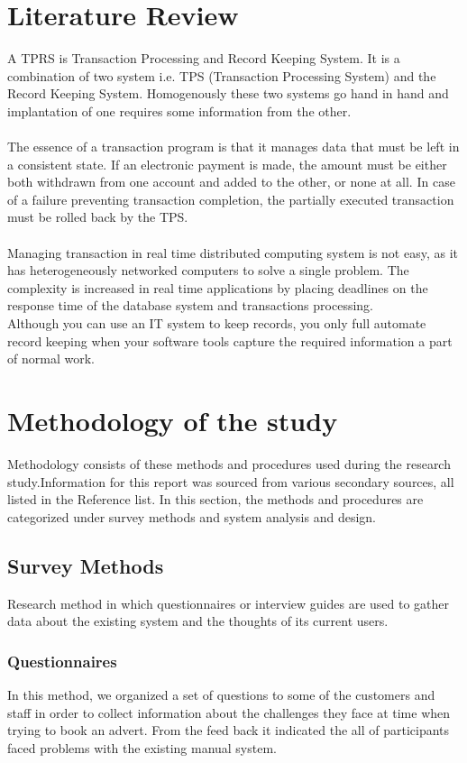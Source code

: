 \documentclass[12pt]{article}
\begin{document}
\section{Literature Review} 
A TPRS is Transaction Processing and Record Keeping System. It is a combination of two system i.e. TPS (Transaction Processing System) and the Record Keeping System.
Homogenously these two systems go hand in hand and implantation of one requires some information from the other.\\\\
\cite{r2}The essence of a transaction program is that it manages data that must be left in a consistent state. If an electronic payment is made, the amount must be either both withdrawn from one account and added to the other, or none at all. In case of a failure preventing transaction completion, the partially executed transaction must be rolled back by the TPS. \\\\
\cite{r3}Managing transaction in real time distributed computing system is not easy, as it has heterogeneously networked computers to solve a single problem. The complexity is increased in real time applications by placing deadlines on the response time of the database system and transactions processing.\\
\cite{r4}Although you can use an IT system to keep records, you only full automate record keeping when your software tools capture the required information a part of normal work. 
\section{Methodology of the study}
Methodology consists of these methods and procedures used during the research study.Information for this report was sourced from various secondary sources, all listed in the Reference list. In this section, the methods and procedures are categorized under survey methods and system analysis and design.
\subsection{Survey Methods}
Research method in which questionnaires or interview guides are used to gather data about the existing system and the thoughts of its current users.
\subsubsection{Questionnaires}
In this method, we organized a set of questions to some of the customers and staff in order to collect information about the challenges they face at time when trying to book an advert. From the feed back it indicated the all of participants faced problems with the existing manual system.
\end{document}
